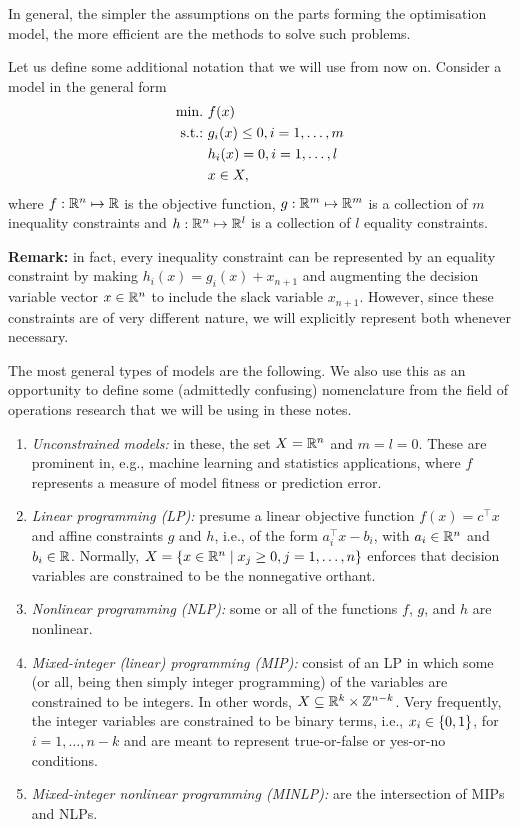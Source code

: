 In general, the simpler the assumptions on the parts forming the optimisation model, the more efficient are the methods to solve such problems. 

Let us define some additional notation that we will use from now on. Consider a model in the general form
%
\begin{align*}
	\mathop{\text{min.~}} & f(x) \\
	\mathop{\text{s.t.:~}}   & g_i(x) \leq 0, i = 1, \dots, m \\
	      & h_i(x) = 0, i = 1, \dots, l \\
	      & x \in X,  
\end{align*}
%
where $f: \mathbb{R}^n \mapsto \mathbb{R}$ is the objective function, $g:\mathbb{R}^m \mapsto \mathbb{R}^m$ is a collection of $m$ inequality constraints and $h: \mathbb{R}^n \mapsto \mathbb{R}^l$ is a collection of $l$ equality constraints.

{\bf Remark:} in fact, every inequality constraint can be represented by an equality constraint by making $h_i(x) = g_i(x) + x_{n+1}$ and augmenting the decision variable vector $x \in \mathbb{R}^n$ to include the slack variable $x_{n+1}$. However, since these constraints are of very different nature, we will explicitly represent both whenever necessary.

The most general types of models are the following. We also use this as an opportunity to define some (admittedly confusing) nomenclature from the field of operations research that we will be using in these notes.
%
\begin{enumerate}
    \item \emph{Unconstrained models:} in these, the set $X = \mathbb{R}^n$ and $m=l=0$. These are prominent in, e.g., machine learning and statistics applications, where $f$ represents a measure of model fitness or prediction error.  
    \item \emph{Linear programming (LP):} presume a linear objective function $f(x) = c^\top x$ and affine constraints $g$ and $h$, i.e., of the form $a_i^\top x - b_i$, with $a_i \in \mathbb{R}^n$ and $b_i \in \mathbb{R}$. Normally, $X = \left\{ x \in \mathbb{R}^n \mid x_j \geq 0, j = 1,\dots, n \right \}$ enforces that decision variables are constrained to be the nonnegative orthant.
    \item \emph{Nonlinear programming (NLP):} some or all of the functions $f$, $g$, and $h$ are nonlinear.
    \item \emph{Mixed-integer (linear) programming (MIP):} consist of an LP in which some (or all, being then simply integer programming) of the variables are constrained to be integers. In other words, $X \subseteq \mathbb{R}^k \times \mathbb{Z}^{n-k}$. Very frequently, the integer variables are constrained to be binary terms, i.e., $x_i \in \left\{ 0,1 \right \}$, for $i = 1,\dots, n-k$ and are meant to represent true-or-false or yes-or-no conditions.
    \item \emph{Mixed-integer nonlinear programming (MINLP):} are the intersection of MIPs and NLPs.  
\end{enumerate}

